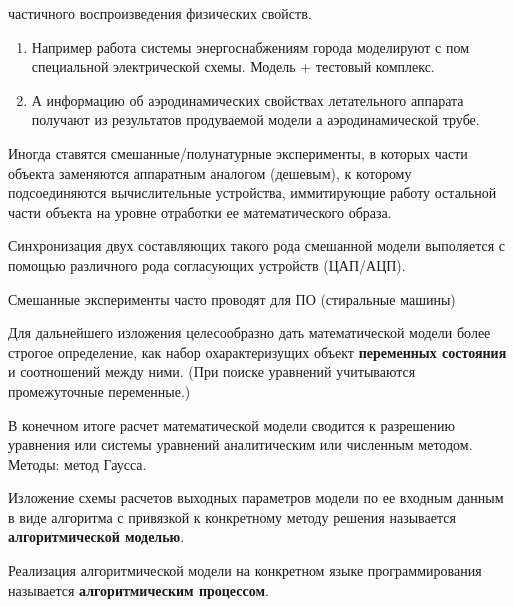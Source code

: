частичного воспроизведения физических свойств.\par
\begin{enumerate}
  \item Например работа системы энергоснабжениям города моделируют с пом
    специальной электрической схемы. Модель + тестовый комплекс.
  \item А информацию об аэродинамических свойствах летательного аппарата
    получают из результатов продуваемой модели а аэродинамической трубе.
\end{enumerate}\par
Иногда ставятся смешанные/полунатурные эксперименты, в которых части объекта
заменяются аппаратным аналогом (дешевым), к которому подсоединяются
вычислительные устройства, иммитирующие работу остальной части объекта на уровне
отработки ее математического образа.\par
Синхронизация двух составляющих такого рода смешанной модели выполяется с
помощью различного рода согласующих устройств (ЦАП/АЦП).\par
Смешанные эксперименты часто проводят для ПО (стиральные машины)\par
Для дальнейшего изложения целесообразно дать математической модели более строгое
определение, как набор охарактеризущих объект \textbf{переменных состояния} и
соотношений между ними. (При поиске уравнений учитываются промежуточные
переменные.)\par
В конечном итоге расчет математической модели сводится к разрешению уравнения
или системы уравнений аналитическим или численным методом. Методы: метод
Гаусса.\par
Изложение схемы расчетов выходных параметров модели по ее входным данным в виде
алгоритма с привязкой к конкретному методу решения называется
\textbf{алгоритмической моделью}.\par
Реализация алгоритмической модели на конкретном языке программирования
называется \textbf{алгоритмическим процессом}.\par
